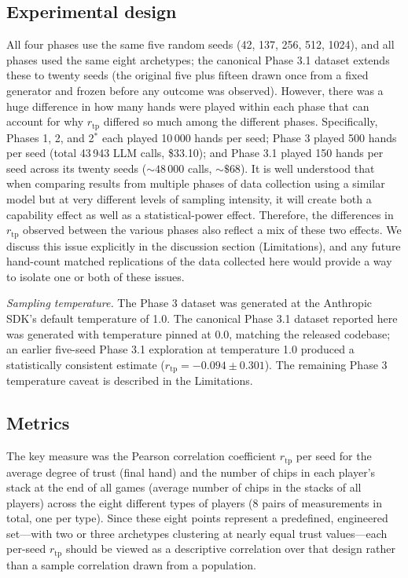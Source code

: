 \documentclass[journal]{IEEEtran}
\newcommand{\rtp}{\ensuremath{r_{\mathrm{tp}}}}
\begin{document}
\subsection{Experimental design}
All four phases use the same five random seeds (42, 137, 256, 512, 1024), and all phases used the same eight archetypes; the canonical Phase 3.1 dataset extends these to twenty seeds (the original five plus fifteen drawn once from a fixed generator and frozen before any outcome was observed). However, there
was a huge difference in how many hands were played within each
phase that can account for why $\rtp$ differed so much among the
different phases. Specifically, Phases 1, 2, and 2$^{*}$ each played
10\,000 hands per seed; Phase 3 played 500 hands per seed (total
43\,943 LLM calls, \$33.10); and Phase 3.1 played 150 hands per seed across its twenty seeds (${\sim}48\,000$ calls, ${\sim}\$68$). It is well understood that when
comparing results from multiple phases of data collection using a
similar model but at very different levels of sampling intensity, it
will create both a capability effect as well as a statistical-power
effect. Therefore, the differences in $\rtp$ observed between the
various phases also reflect a mix of these two effects. We discuss
this issue explicitly in the discussion section (Limitations), and
any future hand-count matched replications of the data collected
here would provide a way to isolate one or both of these issues.

\textit{Sampling temperature.} The Phase 3 dataset was generated at the Anthropic SDK's default temperature of 1.0. The canonical Phase 3.1 dataset reported here was generated with temperature pinned at 0.0, matching the released codebase; an earlier five-seed Phase 3.1 exploration at temperature 1.0 produced a statistically consistent estimate ($\rtp = -0.094 \pm 0.301$). The remaining Phase 3 temperature caveat is described in the Limitations.

\subsection{Metrics}
The key measure was the Pearson correlation coefficient $\rtp$ per
seed for the average degree of trust (final hand) and the number of
chips in each player's stack at the end of all games (average number
of chips in the stacks of all players) across the eight different
types of players (8 pairs of measurements in total, one per type).
Since these eight points represent a predefined, engineered
set---with two or three archetypes clustering at nearly equal trust
values---each per-seed $\rtp$ should be viewed as a descriptive
correlation over that design rather than a sample correlation drawn
from a population.
\end{document}
